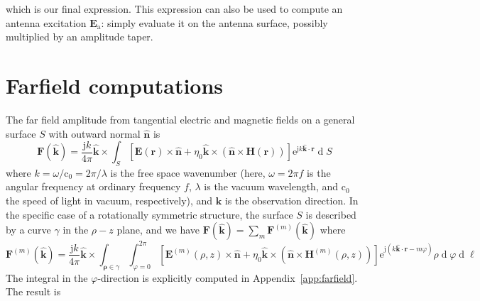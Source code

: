 \documentclass[a4paper,12pt]{article}
\renewcommand{\vec}[1]{\boldsymbol{#1}}
\newcommand{\unitvec}[1]{\hat{\vec{#1}}}
\newcommand{\mrm}[1]{\mathrm{#1}}
\newcommand{\diff}{\operatorname{d}\!}
\newcommand{\ju}{\mrm{j}}
\newcommand{\eu}{\mrm{e}}
\newcommand{\cu}{\mrm{c}_{0}}
\newcommand{\Ev}{\vec{E}}
\newcommand{\Hv}{\vec{H}}
\newcommand{\Fv}{\vec{F}}
\newcommand{\rv}{\vec{r}}
\newcommand{\nuv}{\unitvec{n}}
\newcommand{\kuv}{\unitvec{k}}
\begin{document}
which is our final expression. This expression can also be used to
compute an antenna excitation $\Ev_{\mrm{a}}$: simply evaluate it on
the antenna surface, possibly multiplied by an amplitude taper.

\section{Farfield computations}
\label{sec:farfield}

The far field amplitude from tangential electric and magnetic fields
on a general surface $S$ with outward normal $\nuv$ is
\begin{equation}
  \Fv(\kuv) = \frac{\ju k}{4\pi} \kuv\times \int_{S} \left[ \Ev(\rv)\times\nuv + \eta_{0}\kuv\times(\nuv\times\Hv(\rv)) \right] \eu^{\ju k\kuv\cdot\rv} \diff S
\end{equation}
where $k=\omega/\cu = 2\pi/\lambda$ is the free space wavenumber
(here, $\omega = 2\pi f$ is the angular frequency at ordinary
frequency $f$, $\lambda$ is the vacuum wavelength, and $\cu$ the speed
of light in vacuum, respectively), and $\kuv$ is the observation
direction.  In the specific case of a rotationally symmetric
structure, the surface $S$ is described by a curve $\gamma$ in the
$\rho-z$ plane, and we have $\Fv(\kuv) = \sum_{m}\Fv^{(m)}(\kuv)$ where
\begin{equation}
  \Fv^{(m)}(\kuv) = \frac{\ju k}{4\pi} \kuv\times \int_{\vec{\rho}\in\gamma}\int_{\varphi=0}^{2\pi} \left[ \Ev^{(m)}(\rho,z)\times\nuv + \eta_{0}\kuv\times(\nuv\times\Hv^{(m)}(\rho,z)) \right] \eu^{\ju(k\kuv\cdot\rv-m\varphi)} \rho\diff\varphi\diff\ell
\end{equation}
The integral in the $\varphi$-direction is explicitly computed in
Appendix~\ref{app:farfield}. The result is
\end{document}
